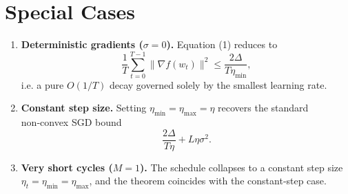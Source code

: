 \documentclass{article}
\begin{document}
\section*{Special Cases}
\begin{enumerate}
\item \textbf{Deterministic gradients ($\sigma=0$).} Equation (1) reduces to
\[
\frac{1}{T}\sum_{t=0}^{T-1}\|\nabla f(w_{t})\|^{2}
\le\frac{2\Delta}{T\eta_{\min}},
\]
i.e. a pure $O(1/T)$ decay governed solely by the smallest learning rate.
\item \textbf{Constant step size.} Setting $\eta_{\min}=\eta_{\max}=\eta$ recovers the standard non‑convex SGD bound
\[
\frac{2\Delta}{T\eta}+L\eta\sigma^{2}.
\]
\item \textbf{Very short cycles ($M=1$).} The schedule collapses to a constant step size $\eta_{t}=\eta_{\min}=\eta_{\max}$, and the theorem coincides with the constant‑step case.
\end{enumerate}
\end{document}
